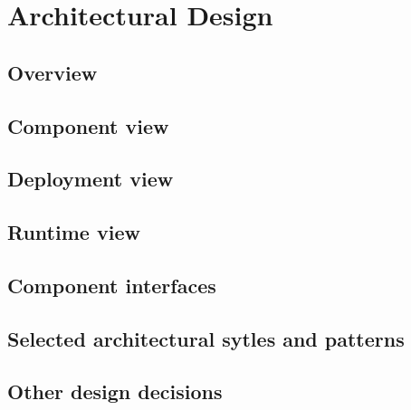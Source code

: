 \documentclass[../DD0.tex]{subfiles}
\begin{document}
\section{Architectural Design}
\label{sec:arcdes}

  \subsection{Overview}
  \label{sec:overview}

  \subsection{Component view}
  \label{sec:compview}

  \subsection{Deployment view}
  \label{sec:deplview}

  \subsection{Runtime view}
  \label{sec:runtview}

  \subsection{Component interfaces}
  \label{sec:compinterf}

  \subsection{Selected architectural sytles and patterns}
  \label{sec:stylesandpatterns}

  \subsection{Other design decisions}
  \label{sec:designdecisions}
\end{document}
